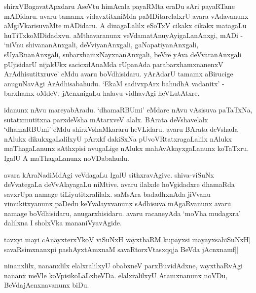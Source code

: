 shirxVBagavatApxdaru AseVtu himAcala payaRMta eraDu sAri payaRTane mADidaru. avaru tamamx vidavxtitxniMda paMDitarelalxrU avara vAdavanunx aMgiVkarisuvaMte mADidaru. A dinagaLalilx eSoTxV cikakx cikakx matagaLu huTiTxkoMDidadxvu. aMthavaranunx veVdamatAnuyAyigaLanAnxgi, mADi - `niVnu shivananAnxgali, deVviyanAnxgali, gaNapatiyanAnxgali, sUyaRnanAnxgali, subarxhamxNayxnanAnxgali, beVre yAva deVvaranAnxgali pUjisidarU nijakUkx sacicxdAnaMda rUpanAda 
parabarxhamxnanenxV ArAdhisutitxruve' eMdu avaru boVdhisidaru. yArAdarU tamamx aBirucige anuguNavAgi ArAdhisabahudu. `EkaM sadivxpArx bahudhA vadanitx' - barxhamx oMdeV, jAcnxnigaLu halavu vidhavAgi heVLutAtxre.

idanunx nAvu mareyabAradu. `dhamaRBUmi' eMdare nAvu vAsisuva paTaTxNa, sutatxmutitxna parxdeVsha mAtarxveV alalx. BArata deVshavelalx `dhamaRBUmi' eMdu shirxVshaMkararu heVLidaru. avaru BArata deVshada nAlukx dikukxgaLalilxyU pArxkf dakiSxNa pUvoVRtatxragaLalilx nAlukx maThagaLanunx sAthxpisi avugaLige nAlukx mahAvAkayxgaLanunx koTaTxru. IgalU A maThagaLanunx noVDabahudu.

avara kAraNadiMdAgi veVdagaLu IgalU sithxravAgive. shiva-viSuNx deVvategaLa deVvAlayagaLu niMtive. avaru ilalxde hoVgidadxre dhamaRda savxrUpa namage tiLiyutitxralilalx. saMsAra badadhxnAda jiVvanu vimukitxyanunx paDedu keYvalayxvanunx sAdhisuva mAgaRvanunx avaru namage boVdhisidaru, anugarxhisidaru. avaru racaneyAda `moVha mudagxra' dalilxna I sholxVka mananiVyavAgide.

\begin{shloka}
tavxyi mayi cAnayxterxYkoV viSuNxH vayxthaRM kupayxsi mayayxsahiSuNxH|\\
savaRsimxnanxpi pashAyxtAmxnaM savaRtorxVtasxqqja BeVda jAcnxnamf||
\end{shloka}

ninanxlilx, nananxlilx elalxralilxyU obabxneV parxBuvidAdxne, vayxthaRvAgi nananx meVle koVpisikoLaLxbeVDa. elalxralilxyU Atamxnanunx noVDu, BeVdajAcnxnavanunx biDu.



\endchapter
